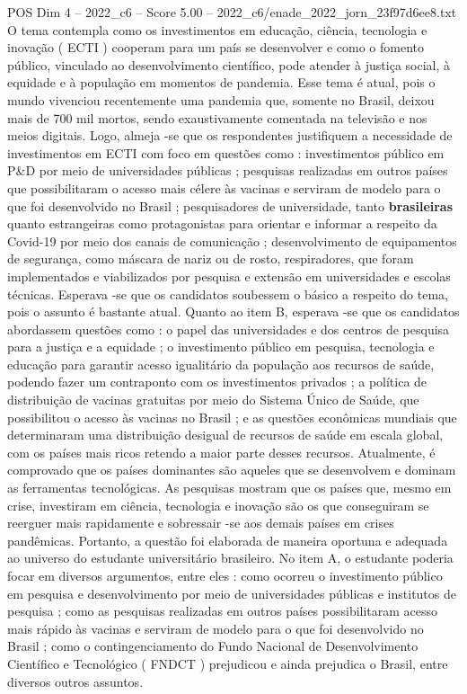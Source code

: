 \begin{textsample}{POS Dim 4 – 2022\_c6 – Score 5.00 – 2022\_c6/enade\_2022\_jorn\_23f97d6ee8.txt}
O tema contempla como os investimentos em educação, ciência, tecnologia e inovação ( ECTI ) cooperam para um país se desenvolver e como o fomento público, vinculado ao desenvolvimento científico, pode atender à justiça social, à equidade e à população em momentos de pandemia.
Esse tema é atual, pois o mundo vivenciou recentemente uma pandemia que, somente no Brasil, deixou mais de 700 mil mortos, sendo exaustivamente comentada na televisão e nos meios digitais.
Logo, almeja -se que os respondentes justifiquem a necessidade de investimentos em ECTI com foco em questões como : investimentos público em P\&D por meio de universidades públicas ; pesquisas realizadas em outros países que possibilitaram o acesso mais célere às vacinas e serviram de modelo para o que foi desenvolvido no Brasil ; pesquisadores de universidade, tanto \textbf{brasileiras} quanto estrangeiras como protagonistas para orientar e informar a respeito da Covid-19 por meio dos canais de comunicação ; desenvolvimento de equipamentos de segurança, como máscara de nariz ou de rosto, respiradores, que foram implementados e viabilizados por pesquisa e extensão em universidades e escolas técnicas.
Esperava -se que os candidatos soubessem o básico a respeito do tema, pois o assunto é bastante atual.
Quanto ao item B, esperava -se que os candidatos abordassem questões como : o papel das universidades e dos centros de pesquisa para a justiça e a equidade ; o investimento público em pesquisa, tecnologia e educação para garantir acesso igualitário da população aos recursos de saúde, podendo fazer um contraponto com os investimentos privados ; a política de distribuição de vacinas gratuitas por meio do Sistema Único de Saúde, que possibilitou o acesso às vacinas no Brasil ; e as questões econômicas mundiais que determinaram uma distribuição desigual de recursos de saúde em escala global, com os países mais ricos retendo a maior parte desses recursos.
Atualmente, é comprovado que os países dominantes são aqueles que se desenvolvem e dominam as ferramentas tecnológicas.
As pesquisas mostram que os países que, mesmo em crise, investiram em ciência, tecnologia e inovação são os que conseguiram se reerguer mais rapidamente e sobressair -se aos demais países em crises pandêmicas.
Portanto, a questão foi elaborada de maneira oportuna e adequada ao universo do estudante universitário brasileiro.
No item A, o estudante poderia focar em diversos argumentos, entre eles : como ocorreu o investimento público em pesquisa e desenvolvimento por meio de universidades públicas e institutos de pesquisa ; como as pesquisas realizadas em outros países possibilitaram acesso mais rápido às vacinas e serviram de modelo para o que foi desenvolvido no Brasil ; como o contingenciamento do Fundo Nacional de Desenvolvimento Científico e Tecnológico ( FNDCT ) prejudicou e ainda prejudica o Brasil, entre diversos outros assuntos.

\end{textsample}
